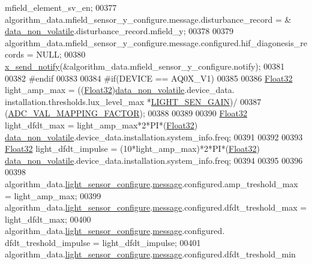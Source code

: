 \begin{DoxyCode}
{{{{{      mfield\_element\_sv\_en;
00377     algorithm\_data.mfield\_sensor\_y\_configure.message.disturbance\_record = &
      \hyperlink{a00060_a76ac5f917f5308dcd83de0d7c94559fb}{data\_non\_volatile}.disturbance\_record.mfield\_y;
00378 
00379     algorithm\_data.mfield\_sensor\_y\_configure.message.configured.hif\_diagonesis\_records = NULL;
00380     \hyperlink{a00036_ae17b0bb16da3c471bb6074bb4c4d0fee}{x\_send\_notify}(&algorithm\_data.mfield\_sensor\_y\_configure.notify);
00381 
00382 \textcolor{preprocessor}{#endif}
00383 
00384 \textcolor{preprocessor}{#if(DEVICE == AQ0X\_V1)}
00385 
00386      \hyperlink{a00072_a87d38f886e617ced2698fc55afa07637}{Float32} light\_amp\_max      = ((\hyperlink{a00072_a87d38f886e617ced2698fc55afa07637}{Float32})\hyperlink{a00060_a76ac5f917f5308dcd83de0d7c94559fb}{data\_non\_volatile}.device\_data.
      installation.thresholds.lux\_level\_max *\hyperlink{a00018_a67d542941eaade236c5f5a224efc7653}{LIGHT\_SEN\_GAIN})/
00387                                    (\hyperlink{a00058_ada92d3eeeec0cbeee41e76a52d145792}{ADC\_VAL\_MAPPING\_FACTOR});
00388 
00389 
00390      \hyperlink{a00072_a87d38f886e617ced2698fc55afa07637}{Float32} light\_dfdt\_max     = light\_amp\_max*2*PI*(\hyperlink{a00072_a87d38f886e617ced2698fc55afa07637}{Float32})
      \hyperlink{a00060_a76ac5f917f5308dcd83de0d7c94559fb}{data\_non\_volatile}.device\_data.installation.system\_info.freq;
00391 
00392 
00393      \hyperlink{a00072_a87d38f886e617ced2698fc55afa07637}{Float32} light\_dfdt\_impulse = (10*light\_amp\_max)*2*PI*(\hyperlink{a00072_a87d38f886e617ced2698fc55afa07637}{Float32})
      \hyperlink{a00060_a76ac5f917f5308dcd83de0d7c94559fb}{data\_non\_volatile}.device\_data.installation.system\_info.freq;
00394 
00395 
00396 
00398     algorithm\_data.\hyperlink{a00016_a8fc7528336e37724802eb52753c7b7a6}{light\_sensor\_configure}.\hyperlink{a00018_a32952acc732e2f16aad59fe0804da5bf}{message}.configured.amp\_treshold\_max 
               = light\_amp\_max;
00399     algorithm\_data.\hyperlink{a00016_a8fc7528336e37724802eb52753c7b7a6}{light\_sensor\_configure}.\hyperlink{a00018_a32952acc732e2f16aad59fe0804da5bf}{message}.configured.dfdt\_treshold\_max
               = light\_dfdt\_max;
00400     algorithm\_data.\hyperlink{a00016_a8fc7528336e37724802eb52753c7b7a6}{light\_sensor\_configure}.\hyperlink{a00018_a32952acc732e2f16aad59fe0804da5bf}{message}.configured.
      dfdt\_treshold\_impulse     = light\_dfdt\_impulse;
00401     algorithm\_data.\hyperlink{a00016_a8fc7528336e37724802eb52753c7b7a6}{light\_sensor\_configure}.\hyperlink{a00018_a32952acc732e2f16aad59fe0804da5bf}{message}.configured.dfdt\_treshold\_min
}}}}}
\end{DoxyCode}

